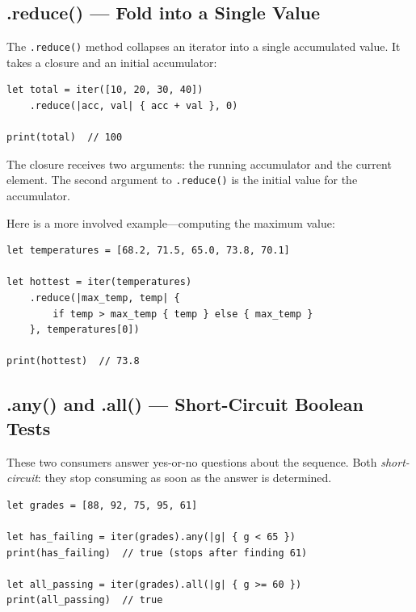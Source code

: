 \subsection{.reduce() --- Fold into a Single Value}\label{subsec:iter-reduce}

The \lstinline|.reduce()| method collapses an iterator into a single accumulated value.
It takes a closure and an initial accumulator:

\begin{lstlisting}[language=Lattice, caption={Reducing an iterator}]
let total = iter([10, 20, 30, 40])
    .reduce(|acc, val| { acc + val }, 0)

print(total)  // 100
\end{lstlisting}

The closure receives two arguments: the running accumulator and the current element.
The second argument to \lstinline|.reduce()| is the initial value for the accumulator.

Here is a more involved example---computing the maximum value:

\begin{lstlisting}[language=Lattice, caption={Finding the maximum with reduce}]
let temperatures = [68.2, 71.5, 65.0, 73.8, 70.1]

let hottest = iter(temperatures)
    .reduce(|max_temp, temp| {
        if temp > max_temp { temp } else { max_temp }
    }, temperatures[0])

print(hottest)  // 73.8
\end{lstlisting}

\subsection{.any() and .all() --- Short-Circuit Boolean Tests}\label{subsec:iter-any-all}

These two consumers answer yes-or-no questions about the sequence.
Both \emph{short-circuit}: they stop consuming as soon as the answer is determined.

\begin{lstlisting}[language=Lattice, caption={Testing with .any() and .all()}]
let grades = [88, 92, 75, 95, 61]

let has_failing = iter(grades).any(|g| { g < 65 })
print(has_failing)  // true (stops after finding 61)

let all_passing = iter(grades).all(|g| { g >= 60 })
print(all_passing)  // true
\end{lstlisting}

